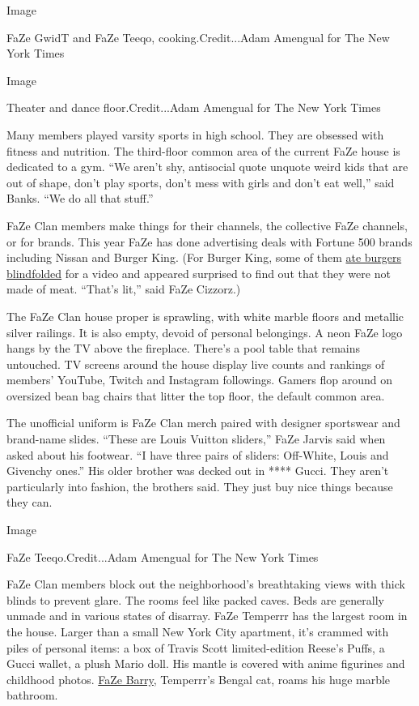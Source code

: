 Image

FaZe GwidT and FaZe Teeqo, cooking.Credit...Adam Amengual for The New
York Times

Image

Theater and dance floor.Credit...Adam Amengual for The New York Times

Many members played varsity sports in high school. They are obsessed
with fitness and nutrition. The third-floor common area of the current
FaZe house is dedicated to a gym. ``We aren't shy, antisocial quote
unquote weird kids that are out of shape, don't play sports, don't mess
with girls and don't eat well,'' said Banks. ``We do all that stuff.''

FaZe Clan members make things for their channels, the collective FaZe
channels, or for brands. This year FaZe has done advertising deals with
Fortune 500 brands including Nissan and Burger King. (For Burger King,
some of them \href{https://www.youtube.com/watch?v=px4VL4QUfcU}{ate
burgers blindfolded} for a video and appeared surprised to find out that
they were not made of meat. ``That's lit,'' said FaZe Cizzorz.)

The FaZe Clan house proper is sprawling, with white marble floors and
metallic silver railings. It is also empty, devoid of personal
belongings. A neon FaZe logo hangs by the TV above the fireplace.
There's a pool table that remains untouched. TV screens around the house
display live counts and rankings of members' YouTube, Twitch and
Instagram followings. Gamers flop around on oversized bean bag chairs
that litter the top floor, the default common area.

The unofficial uniform is FaZe Clan merch paired with designer
sportswear and brand-name slides. ``These are Louis Vuitton sliders,''
FaZe Jarvis said when asked about his footwear. ``I have three pairs of
sliders: Off-White, Louis and Givenchy ones.'' His older brother was
decked out in **** Gucci. They aren't particularly into fashion, the
brothers said. They just buy nice things because they can.

Image

FaZe Teeqo.Credit...Adam Amengual for The New York Times

FaZe Clan members block out the neighborhood's breathtaking views with
thick blinds to prevent glare. The rooms feel like packed caves. Beds
are generally unmade and in various states of disarray. FaZe Temperrr
has the largest room in the house. Larger than a small New York City
apartment, it's crammed with piles of personal items: a box of Travis
Scott limited-edition Reese's Puffs, a Gucci wallet, a plush Mario doll.
His mantle is covered with anime figurines and childhood photos.
\href{https://www.instagram.com/fazebarry}{FaZe Barry}, Temperrr's
Bengal cat, roams his huge marble bathroom.

